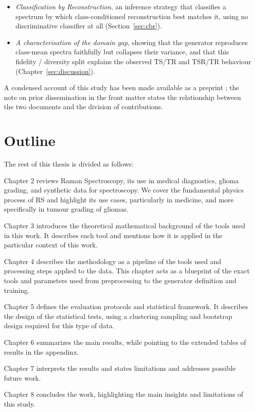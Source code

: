 \begin{itemize}
  \item \emph{Classification by Reconstruction}, an inference strategy that classifies a
        spectrum by which class-conditioned reconstruction best matches it, using no
        discriminative classifier at all (Section~\ref{sec:cbr}).

  \item \emph{A characterisation of the domain gap}, showing that the generator reproduces
        class-mean spectra faithfully but collapses their variance, and that this fidelity /
        diversity split explains the observed TS/TR and TSR/TR behaviour
        (Chapter~\ref{sec:discussion}).
\end{itemize}

A condensed account of this study has been made available as a preprint \cite{iusan2026raman}; the note on prior dissemination in the front matter states the relationship between the two documents and the division of contributions.

\section*{Outline}

The rest of this thesis is divided as follows:

Chapter 2 reviews Raman Spectroscopy, its use in medical diagnostics, glioma grading, and synthetic data
for spectroscopy. We cover the fundamental physics process of RS and highlight its use cases, particularly in medicine, and more specifically in tumour grading of gliomas.

Chapter 3 introduces the theoretical mathematical background of the tools used in this work. It describes each tool and mentions how it is applied in the particular context of this work.

Chapter 4 describes the methodology as a pipeline of the tools used and processing steps applied to the data. This chapter acts as a blueprint of the exact tools and parameters used from preprocessing to the generator definition and training.

Chapter 5 defines the evaluation protocols and statistical framework. It describes the design of the statistical tests, using a clustering sampling and bootstrap design required for this type of data.

Chapter 6 summarizes the main results, while pointing to the extended tables of results in the appendinx.

Chapter 7 interprets the results and states limitations and addresses possible future work.

Chapter 8 concludes the work, highlighting the main insights and limitations of this study.

